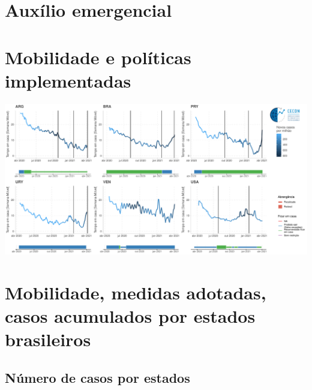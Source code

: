 \documentclass{SelfArx}
\begin{document}
\section*{Auxílio emergencial}
\label{sec:orgb7d225c}

\npdecimalsign{,}
\begin{figure}[h]
    \resizebox{\textwidth}{!}{%
    } 
\end{figure}

\section*{Mobilidade e políticas implementadas}
\label{sec:orga4fec90}

\begin{center}
\includegraphics[width=.9\linewidth]{./figs/COVID/Mobilidade_Policy_selected_C6.pdf}
\end{center}




\section*{Mobilidade, medidas adotadas, casos acumulados por estados brasileiros}
\label{sec:org3774128}

\subsection*{Número de casos por estados}
\label{sec:org7947a03}
\end{document}
